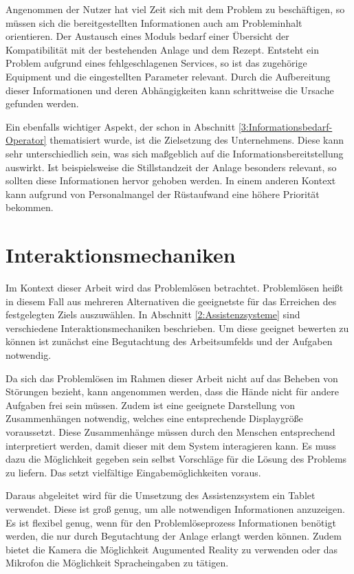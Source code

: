 Angenommen der Nutzer hat viel Zeit sich mit dem Problem zu beschäftigen, so müssen sich die bereitgestellten Informationen auch am Probleminhalt orientieren. Der Austausch eines Moduls bedarf einer Übersicht der Kompatibilität mit der bestehenden Anlage und dem Rezept. Entsteht ein Problem aufgrund eines fehlgeschlagenen Services, so ist das zugehörige Equipment und die eingestellten Parameter relevant. Durch die Aufbereitung dieser Informationen und deren Abhängigkeiten kann schrittweise die Ursache gefunden werden.

Ein ebenfalls wichtiger Aspekt, der schon in Abschnitt \ref{3:Informationsbedarf-Operator} thematisiert wurde, ist die Zielsetzung des Unternehmens. Diese kann sehr unterschiedlich sein, was sich maßgeblich auf die Informationsbereitstellung auswirkt. Ist beispielsweise die Stillstandzeit der Anlage besonders relevant, so sollten diese Informationen hervor gehoben werden. In einem anderen Kontext kann aufgrund von Personalmangel der Rüstaufwand eine höhere Priorität bekommen.

\section{Interaktionsmechaniken}
Im Kontext dieser Arbeit wird das Problemlösen betrachtet. Problemlösen heißt in diesem Fall aus mehreren Alternativen die geeignetste für das Erreichen des festgelegten Ziels auszuwählen. In Abschnitt \ref{2:Assistenzsysteme} sind verschiedene Interaktionsmechaniken beschrieben. Um diese geeignet bewerten zu können ist zunächst eine Begutachtung des Arbeitsumfelds und der Aufgaben notwendig.

Da sich das Problemlösen im Rahmen dieser Arbeit nicht auf das Beheben von Störungen bezieht, kann angenommen werden, dass die Hände nicht für andere Aufgaben frei sein müssen. Zudem ist eine geeignete Darstellung von Zusammenhängen notwendig, welches eine entsprechende Displaygröße voraussetzt. Diese Zusammenhänge müssen durch den Menschen entsprechend interpretiert werden, damit dieser mit dem System interagieren kann. Es muss dazu die Möglichkeit gegeben sein selbst Vorschläge für die Lösung des Problems zu liefern. Das setzt vielfältige Eingabemöglichkeiten voraus. 

Daraus abgeleitet wird für die Umsetzung des Assistenzsystem ein Tablet verwendet. Diese ist groß genug, um alle notwendigen Informationen anzuzeigen. Es ist flexibel genug, wenn für den Problemlöseprozess Informationen benötigt werden, die nur durch Begutachtung der Anlage erlangt werden können. Zudem bietet die Kamera die Möglichkeit Augumented Reality zu verwenden oder das Mikrofon die Möglichkeit Spracheingaben zu tätigen.



